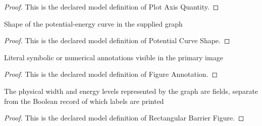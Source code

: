 \begin{proof}
  This is the declared model definition of Plot Axis Quantity.
\end{proof}
\begin{definition}
  \label{def:physics:phyx-mini-0520:phyxminiproblems-problemphyxmini0520-potentialcurveshape}
  Shape of the potential-energy curve in the supplied graph
\end{definition}
\begin{proof}
  This is the declared model definition of Potential Curve Shape.
\end{proof}
\begin{definition}
  \label{def:physics:phyx-mini-0520:phyxminiproblems-problemphyxmini0520-figureannotation}
  Literal symbolic or numerical annotations visible in the primary image
\end{definition}
\begin{proof}
  This is the declared model definition of Figure Annotation.
\end{proof}
\begin{definition}
  \label{def:physics:phyx-mini-0520:phyxminiproblems-problemphyxmini0520-rectangularbarrierfigure}
  The physical width and energy levels represented by the graph are fields, separate from the Boolean record of which labels are printed
\end{definition}
\begin{proof}
  This is the declared model definition of Rectangular Barrier Figure.
\end{proof}

